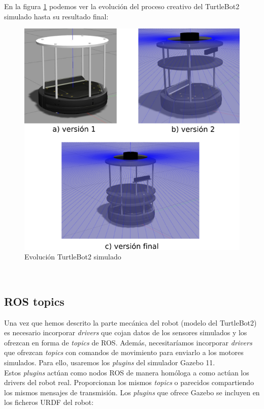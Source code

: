 En la figura \ref{fig:evolucion_turtlebot2_sim} podemos ver la evolución del proceso creativo del TurtleBot2 simulado hasta su resultado final:\\
\begin{figure} [H]
  \begin{center}
    \includegraphics[width=12.5cm]{imagenes/cap4/creacion-turtlebot2-sim.png}
  \end{center}
  \caption[Evolución TurtleBot2 simulado]{Evolución TurtleBot2 simulado}
  \label{fig:evolucion_turtlebot2_sim}
\end{figure}\


\subsection{ROS topics}
\label{subsec:ros_topics}

Una vez que hemos descrito la parte mecánica del robot (modelo del TurtleBot2) es necesario incorporar \textit{drivers} que cojan datos de los sensores simulados y los ofrezcan en forma de \textit{topics} de ROS. Además, necesitaríamos incorporar \textit{drivers} que ofrezcan \textit{topics} con comandos de movimiento para enviarlo a los motores simulados. Para ello, usaremos los \textit{plugins} del simulador Gazebo 11.\\

Estos \textit{plugins} actúan como nodos ROS de manera homóloga a como actúan los drivers del robot real. Proporcionan los mismos \textit{topics} o parecidos compartiendo los mismos mensajes de transmisión. Los \textit{plugins} que ofrece Gazebo se incluyen en los ficheros URDF del robot:\\

